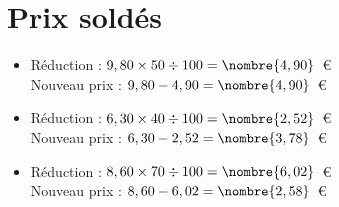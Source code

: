 \documentclass[a4paper,11pt,fleqn]{article}
\begin{document}
\section{Prix soldés}
\begin{itemize}

  \item Réduction : $9,80\times50\div100=\nombre{4,90}$~€\\
  Nouveau prix : $9,80-4,90=\nombre{4,90}$~€
  \item Réduction : $6,30\times40\div100=\nombre{2,52}$~€\\
  Nouveau prix : $6,30-2,52=\nombre{3,78}$~€
  \item Réduction : $8,60\times70\div100=\nombre{6,02}$~€\\
  Nouveau prix : $8,60-6,02=\nombre{2,58}$~€
\end{itemize}
\end{document}
